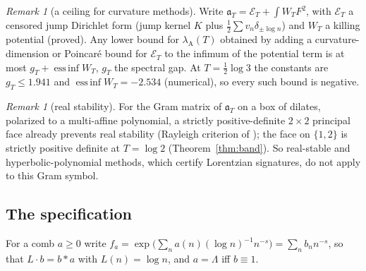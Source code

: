 \documentclass[11pt]{amsart}
\theoremstyle{definition}
\theoremstyle{remark}
\newtheorem{remark}[theorem]{Remark}
\newcommand{\lamA}{\lambda_{\mathrm A}(T)}
\begin{document}
\begin{remark}[a ceiling for curvature methods]
Write $\mathfrak a_T=\mathcal E_T+\int W_TF^2$, with $\mathcal E_T$ a censored jump Dirichlet form (jump kernel $K$ plus
$\frac12\sum v_n\delta_{\pm\log n}$) and $W_T$ a killing potential (proved). Any lower bound for $\lamA$ obtained by adding a
curvature-dimension or Poincaré bound for $\mathcal E_T$ to the infimum of the potential term is at most $g_T+\operatorname{ess\,inf}W_T$,
$g_T$ the spectral gap. At $T=\frac12\log3$ the constants are $g_T\le1.941$ and $\operatorname{ess\,inf}W_T=-2.534$
(numerical), so every such bound is negative.
\end{remark}

\begin{remark}[real stability]
For the Gram matrix of $\mathfrak a_T$ on a box of dilates, polarized to a multi-affine polynomial, a strictly positive-definite
$2\times2$ principal face already prevents real stability (Rayleigh criterion of \cite{Branden2007}); the face on $\{1,2\}$ is strictly
positive definite at $T=\log2$ (Theorem~\ref{thm:band}). So real-stable and hyperbolic-polynomial methods, which certify Lorentzian
signatures, do not apply to this Gram symbol.
\end{remark}

\subsection{The specification}

For a comb $a\ge0$ write $f_a=\exp\big(\sum_na(n)(\log n)^{-1}n^{-s}\big)=\sum_nb_n n^{-s}$, so that $L\cdot b=b*a$ with $L(n)=\log n$, and
$a=\Lambda$ iff $b\equiv1$.
\end{document}
